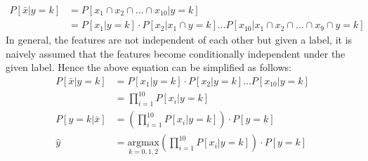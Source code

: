 \documentclass[12pt, a4paper, twoside]{article}
\begin{document}
\begin{align}
	P [\bar{x} | y=k] &= P [x_1 \cap x_2 \cap \dots \cap x_{10} | y=k] \\
	&= P [x_1 | y=k] \cdot P[x_2 | x_1 \cap y=k] \dots P[x_10 | x_1 \cap x_2 \cap \dots \cap x_9 \cap y=k]
\end{align}
In general, the features are not independent of each other but given a label, it is naively assumed that the features become conditionally independent under the given label. Hence the above equation can be simplified as follows:
\begin{align}
	P [\bar{x} | y=k] &= P[x_1 | y=k] \cdot P[x_2 | y=k] \dots P[x_{10} | y=k] \\
	&= \prod_{i = 1}^{10} P[x_i | y = k] \\
	P [y=k | \bar{x}] &= \left(  \prod_{i = 1}^{10} P[x_i | y = k] \right) \cdot P[y=k] \\
	\hat{y} &= \underset{k = 0, 1, 2}{\text{argmax}} \left(  \prod_{i = 1}^{10} P[x_i | y = k] \right) \cdot P[y=k]
\end{align}  


\printbibliography
\end{document}
